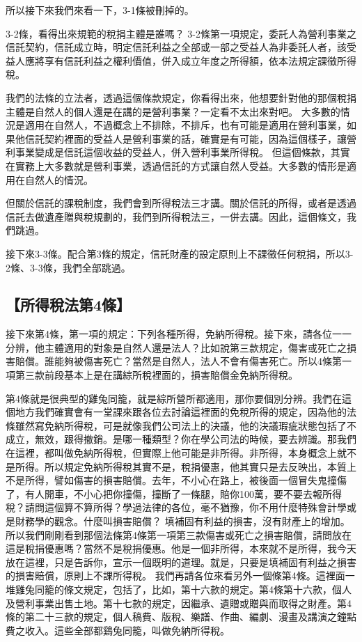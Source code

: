 \documentclass[]{ctexbook}
\begin{document}
所以接下來我們來看一下，3-1條被刪掉的。

3-2條，看得出來規範的稅捐主體是誰嗎？
3-2條第一項規定，委託人為營利事業之信託契約，信託成立時，明定信託利益之全部或一部之受益人為非委託人者，該受益人應將享有信託利益之權利價值，併入成立年度之所得額，依本法規定課徵所得稅。

我們的法條的立法者，透過這個條款規定，你看得出來，他想要針對他的那個稅捐主體是自然人的個人還是在講的是營利事業？一定看不太出來對吧。
大多數的情況是適用在自然人，不過概念上不排除，不排斥，也有可能是適用在營利事業，如果他信託契約裡面的受益人是營利事業的話，確實是有可能，因為這個樣子，讓營利事業變成是信託這個收益的受益人，併入營利事業所得稅。
但這個條款，其實在實務上大多數就是營利事業，透過信託的方式讓自然人受益。大多數的情形是適用在自然人的情況。

但關於信託的課稅制度，我們會到所得稅法三才講。關於信託的所得，或者是透過信託去做遺產贈與稅規劃的，我們到所得稅法三，一併去講。因此，這個條文，我們跳過。

接下來3-3條。配合第3條的規定，信託財產的設定原則上不課徵任何稅捐，所以3-2條、3-3條，我們全部跳過。

\hypertarget{ux6240ux5f97ux7a05ux6cd5ux7b2c4ux689d}{%
\subsection{【所得稅法第4條】}\label{ux6240ux5f97ux7a05ux6cd5ux7b2c4ux689d}}

接下來第4條，第一項的規定：下列各種所得，免納所得稅。接下來，請各位一一分辨，他主體適用的對象是自然人還是法人？比如說第三款規定，傷害或死亡之損害賠償。誰能夠被傷害死亡？當然是自然人，法人不會有傷害死亡。所以4條第一項第三款前段基本上是在講綜所稅裡面的，損害賠償金免納所得稅。

第4條就是很典型的雞兔同籠，就是綜所營所都適用，那你要個別分辨。我們在這個地方我們確實會有一堂課來跟各位去討論這裡面的免稅所得的規定，因為他的法條雖然寫免納所得稅，可是就像我們公司法上的決議，他的決議瑕疵狀態包括了不成立，無效，跟得撤銷。是哪一種類型？你在學公司法的時候，要去辨識。那我們在這裡，都叫做免納所得稅，但實際上他可能是非所得。非所得，本身概念上就不是所得。所以規定免納所得稅其實不是，稅捐優惠，他其實只是去反映出，本質上不是所得，譬如傷害的損害賠償。去年，不小心在路上，被後面一個冒失鬼撞傷了，有人開車，不小心把你撞傷，撞斷了一條腿，賠你100萬，要不要去報所得稅？請問這個算不算所得？學過法律的各位，毫不猶豫，你不用什麼特殊會計學或是財務學的觀念。什麼叫損害賠償？ 填補固有利益的損害，沒有財產上的增加。所以我們剛剛看到那個法條第4條第一項第三款傷害或死亡之損害賠償，請問放在這是稅捐優惠嗎？當然不是稅捐優惠。他是一個非所得，本來就不是所得，我今天放在這裡，只是告訴你，宣示一個既明的道理。就是，只要是填補固有利益之損害的損害賠償，原則上不課所得稅。
我們再請各位來看另外一個條第4條。這裡面一堆雞兔同籠的條文規定，包括了，比如，第十六款的規定。第4條第十六款，個人及營利事業出售土地。第十七款的規定，因繼承、遺贈或贈與而取得之財產。第4條的第二十三款的規定，個人稿費、版稅、樂譜、作曲、編劇、漫畫及講演之鐘點費之收入。這些全部都鷄兔同籠，叫做免納所得稅。
\end{document}
